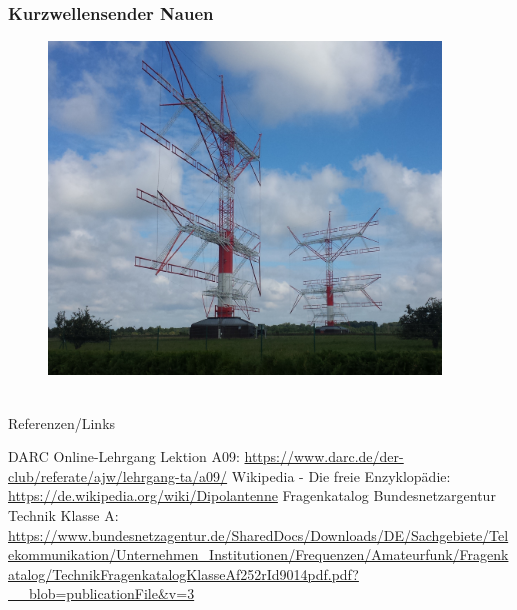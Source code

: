 \begin{frame}
  \frametitle{Kurzwellensender Nauen}
  \begin{center}
    \begin{figure}
      \includegraphics[width=0.93\textwidth,height=.75\textheight,keepaspectratio]{a09/Nauen_Dipolarray.jpg}
    \end{figure}
  \end{center}
\end{frame}



\renewcommand{\refname}{Referenzen}

\hypertarget{refs}{}
\textcolor{white}{} \\ %
\Large Referenzen/Links
\footnotesize

\begin{thebibliography}{}
    DARC Online-Lehrgang Lektion A09:
    \url{https://www.darc.de/der-club/referate/ajw/lehrgang-ta/a09/}
      Wikipedia - Die freie Enzyklopädie:
    \url{https://de.wikipedia.org/wiki/Dipolantenne}
     Fragenkatalog Bundesnetzargentur Technik Klasse A:
    \url{https://www.bundesnetzagentur.de/SharedDocs/Downloads/DE/Sachgebiete/Telekommunikation/Unternehmen_Institutionen/Frequenzen/Amateurfunk/Fragenkatalog/TechnikFragenkatalogKlasseAf252rId9014pdf.pdf?__blob=publicationFile&v=3}
\end{thebibliography}


